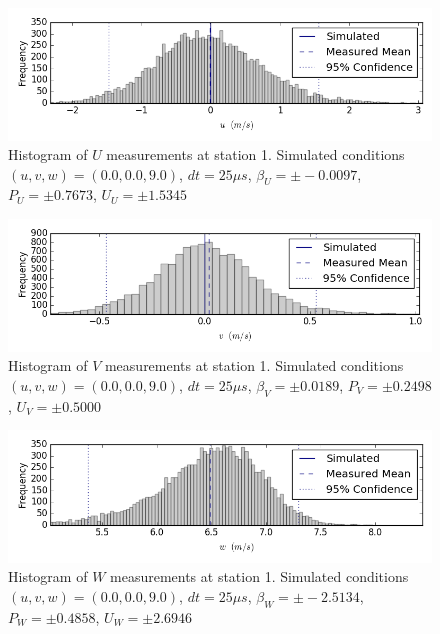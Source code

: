 \begin{figure}[H]
\centering
\includegraphics[width=6in]{figs/Ely_May28th01003/uncertainty_Ely_May28th01003_U}
\caption{Histogram of $U$ measurements at station 1. Simulated conditions $(u,v,w)=(0.0, 0.0, 9.0)$, $dt=25 \mu s$, $\beta_U=\pm -0.0097$, $P_U=\pm 0.7673$, $U_U=\pm 1.5345$}
\label{fig:uncertainty_Ely_May28th01003_U}
\end{figure}


\begin{figure}[H]
\centering
\includegraphics[width=6in]{figs/Ely_May28th01003/uncertainty_Ely_May28th01003_V}
\caption{Histogram of $V$ measurements at station 1. Simulated conditions $(u,v,w)=(0.0, 0.0, 9.0)$, $dt=25 \mu s$, $\beta_V=\pm 0.0189$, $P_V=\pm 0.2498$, $U_V=\pm 0.5000$}
\label{fig:uncertainty_Ely_May28th01003_V}
\end{figure}


\begin{figure}[H]
\centering
\includegraphics[width=6in]{figs/Ely_May28th01003/uncertainty_Ely_May28th01003_W}
\caption{Histogram of $W$ measurements at station 1. Simulated conditions $(u,v,w)=(0.0, 0.0, 9.0)$, $dt=25 \mu s$, $\beta_W=\pm -2.5134$, $P_W=\pm 0.4858$, $U_W=\pm 2.6946$}
\label{fig:uncertainty_Ely_May28th01003_W}
\end{figure}


